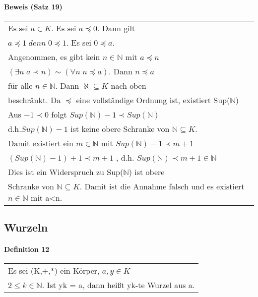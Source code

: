 \documentclass[a4paper]{scrartcl}
\begin{document}
\paragraph{Beweis (Satz 19)}
\begin{tabbing}
\begin{tabular}{l}
Es sei $a \in K$. Es sei $a \preceq 0$. Dann gilt \\
$a \preceq 1 \; denn\; 0 \preceq 1$. Es sei $0 \preceq a$.\\
Angenommen, es gibt kein $n \in \mathbb{N} $ mit $a \preceq n$ \\
$ (\exists n\;a \prec n) \sim (\forall n\;n\preceq a)$. Dann $n\preceq a$ \\
für alle $n\in \mathbb{N} $. Dann $ \aleph \subseteq K $ nach oben\\
beschränkt. Da $\preceq$ eine vollständige Ordnung ist, existiert 
Sup($ \mathbb{N} $)\\
Aus $ -1 \prec 0 $ folgt $Sup(\mathbb{N}) -1 \prec Sup(\mathbb{N})$ \\
d.h.$Sup(\mathbb{N})-1$ ist keine obere Schranke von $\mathbb{N} \subseteq K$. \\
Damit existiert ein $m\in \mathbb{N}$ mit $Sup(\mathbb{N})-1 \prec m+1$ \\
$(Sup(\mathbb{N})-1 )+1\prec m+1$ , d.h. $Sup(\mathbb{N})\prec m+1 \in \mathbb{N}$\\
Dies ist ein Widerspruch zu Sup($\mathbb{N}$) ist obere\\
Schranke von $\mathbb{N} \subseteq K$. Damit ist die Annahme falsch und es existiert $n\in \mathbb{N}$ mit a<n.
\end{tabular}
\end{tabbing}

\subsection{Wurzeln}

\paragraph{Definition 12}
\begin{tabbing}
\begin{tabular}{l}
Es sei (K,+,*) ein Körper, $a,y\in K$\\
$ 2 \leq k \in \mathbb{N} $. Ist yk = a, dann heißt yk-te Wurzel aus a.\\
\end{tabular}
\end{tabbing}
\end{document}
